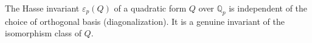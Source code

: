 The Hasse invariant $\varepsilon_p(Q)$ of a quadratic form $Q$ over $\mathbb{Q}_p$ is independent of the choice of orthogonal basis (diagonalization). It is a genuine invariant of the isomorphism class of $Q$.
